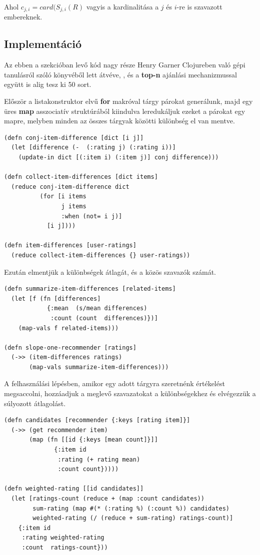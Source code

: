 \documentclass[final, 12pt] {ubb_dolgozat}{book}
\begin{document}
\citep{lemireSlopeOnePredictors2008}

Ahol \(c_{j,i} = card(S_{j,i}(R)\) vagyis a kardinalitása a \(j\) és \(i\)-re is szavazott embereknek.

\subsection{Implementáció}
\label{sec:org1b53c09}
Az ebben a szekcióban levő kód nagy része Henry Garner Clojureben való gépi tanulásról
szóló könyvéből lett átvéve, \citep{garnerClojureDataScience2015} , és a \textbf{top-n} ajánlási mechanizmussal együtt is alig tesz ki 50 sort.

Először a listakonstruktor elvű \textbf{for} makróval tárgy párokat generálunk, majd egy üres \textbf{map} asszociatív struktúrából kiindulva leredukáljuk ezeket a párokat egy mapre, melyben
minden az összes tárgyak közötti különbség el van mentve.

\begin{verbatim}
(defn conj-item-difference [dict [i j]]
  (let [difference (-  (:rating j) (:rating i))]
    (update-in dict [(:item i) (:item j)] conj difference)))

(defn collect-item-differences [dict items]
  (reduce conj-item-difference dict
          (for [i items
                j items
                :when (not= i j)]
            [i j])))

(defn item-differences [user-ratings]
  (reduce collect-item-differences {} user-ratings))
\end{verbatim}

Ezután elmentjük a különbségek átlagát, és a közös szavazók számát.

\begin{verbatim}
(defn summarize-item-differences [related-items]
  (let [f (fn [differences]
            {:mean  (s/mean differences)
             :count (count  differences)})]
    (map-vals f related-items)))

(defn slope-one-recommender [ratings]
  (->> (item-differences ratings)
       (map-vals summarize-item-differences)))
\end{verbatim}

A felhasználási lépésben, amikor egy adott tárgyra szeretnénk értékelést megsaccolni,
hozzáadjuk a meglevő szavazatokat a különbségekhez és elvégezzük a súlyozott átlagolást.

\begin{verbatim}
(defn candidates [recommender {:keys [rating item]}]
  (->> (get recommender item)
       (map (fn [[id {:keys [mean count]}]]
              {:item id
               :rating (+ rating mean)
               :count count}))))

(defn weighted-rating [[id candidates]]
  (let [ratings-count (reduce + (map :count candidates))
        sum-rating (map #(* (:rating %) (:count %)) candidates)
        weighted-rating (/ (reduce + sum-rating) ratings-count)]
    {:item id
     :rating weighted-rating
     :count  ratings-count}))
\end{verbatim}
\end{document}

